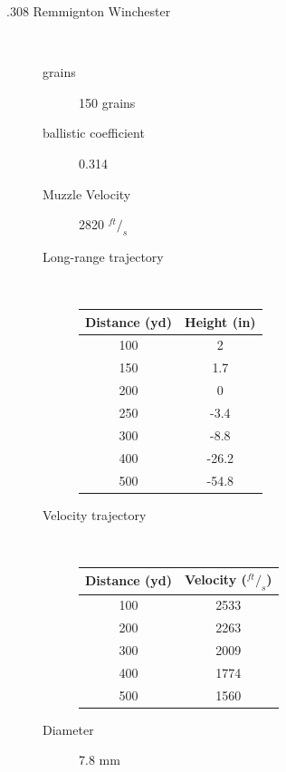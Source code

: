 \documentclass{article}%
\begin{document}
    \begin{description}
        \item[.308 Remmignton Winchester]\mbox{ }
            \begin{description}
                \item[grains] 150 grains
                \item[ballistic coefficient] 0.314
                \item[Muzzle Velocity] 2820 $^{ft}/_s$
                \item[Long-range trajectory] \mbox{ }
                \begin{table}[h!]
                \center
                    \begin{tabular}{c|c}
                        Distance (yd) & Height (in) \\ \hline
                        100 & 2 \\
                        150 & 1.7 \\
                        200 & 0 \\
                        250 & -3.4 \\
                        300 & -8.8 \\
                        400 & -26.2 \\
                        500 & -54.8 \\
                    \end{tabular}
                \end{table}
                \item[Velocity trajectory] \mbox{ }
                \begin{table}[h!]
                \center
                    \begin{tabular}{c|c}
                        Distance (yd) & Velocity ($^{ft}/_s$) \\ \hline
                        100 & 2533 \\
                        200 & 2263 \\
                        300 & 2009 \\
                        400 & 1774 \\
                        500 & 1560 \\
                    \end{tabular}
                \end{table}
                \item[Diameter] 7.8 mm
            \end{description}

\end{description}
\end{document}

